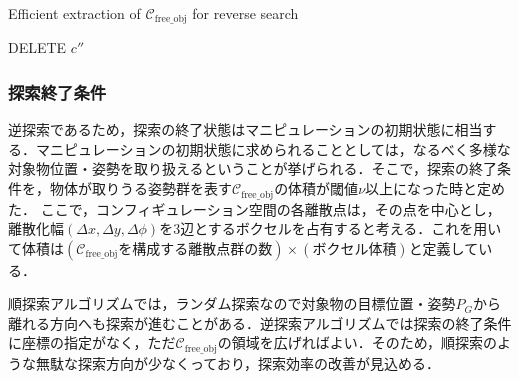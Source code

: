 \documentclass[a4paper,twoside,12pt,papersize, dvipdfmx]{iirthesis}
\begin{document}
\begin{algorithm}[tb]
\caption{Efficient extraction of $\mathcal{C}_{\mathrm{free\_obj}}$ for reverse search}
\label{algo::planner::revdfs}
\begin{algorithmic}[1]
\EndIf
\EndFor
{}
\EndFor
 DELETE  $c''$
\EndFor
\end{algorithmic}
\end{algorithm}

\subsubsection{探索終了条件}
逆探索であるため，探索の終了状態はマニピュレーションの初期状態に相当する．マニピュレーションの初期状態に求められることとしては，なるべく多様な対象物位置・姿勢を取り扱えるということが挙げられる．そこで，探索の終了条件を，物体が取りうる姿勢群を表す$\mathcal{C}_{\mathrm{free\_obj}}$の体積が閾値$\nu$以上になった時と定めた．
ここで，コンフィギュレーション空間の各離散点は，その点を中心とし，離散化幅$(\Delta x, \Delta y, \Delta \phi)$を3辺とするボクセルを占有すると考える．これを用いて体積は$(\mathcal{C}_{\mathrm{free\_obj}}を構成する離散点群の数)\times (ボクセル体積)$と定義している．\par
順探索アルゴリズムでは，ランダム探索なので対象物の目標位置・姿勢$P_G$から離れる方向へも探索が進むことがある．逆探索アルゴリズムでは探索の終了条件に座標の指定がなく，ただ$\mathcal{C}_{\mathrm{free\_obj}}$の領域を広げればよい．そのため，順探索のような無駄な探索方向が少なくっており，探索効率の改善が見込める．
\end{document}

